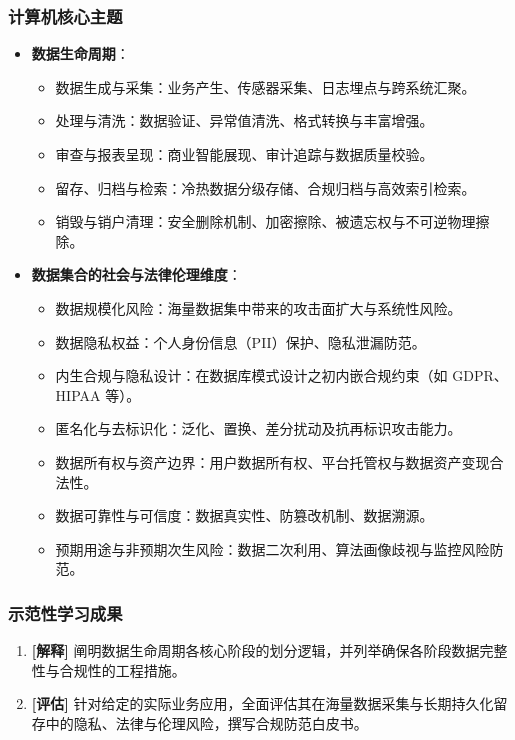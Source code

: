 \subsubsection{计算机核心主题}
\begin{itemize}
    \item \textbf{数据生命周期}：
    \begin{itemize}
        \item 数据生成与采集：业务产生、传感器采集、日志埋点与跨系统汇聚。
        \item 处理与清洗：数据验证、异常值清洗、格式转换与丰富增强。
        \item 审查与报表呈现：商业智能展现、审计追踪与数据质量校验。
        \item 留存、归档与检索：冷热数据分级存储、合规归档与高效索引检索。
        \item 销毁与销户清理：安全删除机制、加密擦除、被遗忘权与不可逆物理擦除。
    \end{itemize}
    \item \textbf{数据集合的社会与法律伦理维度}：
    \begin{itemize}
        \item 数据规模化风险：海量数据集中带来的攻击面扩大与系统性风险。
        \item 数据隐私权益：个人身份信息（PII）保护、隐私泄漏防范。
        \item 内生合规与隐私设计：在数据库模式设计之初内嵌合规约束（如 GDPR、HIPAA 等）。
        \item 匿名化与去标识化：泛化、置换、差分扰动及抗再标识攻击能力。
        \item 数据所有权与资产边界：用户数据所有权、平台托管权与数据资产变现合法性。
        \item 数据可靠性与可信度：数据真实性、防篡改机制、数据溯源。
        \item 预期用途与非预期次生风险：数据二次利用、算法画像歧视与监控风险防范。
    \end{itemize}
\end{itemize}

\subsubsection{示范性学习成果}
\begin{enumerate}
    \item \textbf{[解释]} 阐明数据生命周期各核心阶段的划分逻辑，并列举确保各阶段数据完整性与合规性的工程措施。
    \item \textbf{[评估]} 针对给定的实际业务应用，全面评估其在海量数据采集与长期持久化留存中的隐私、法律与伦理风险，撰写合规防范白皮书。
\end{enumerate}


